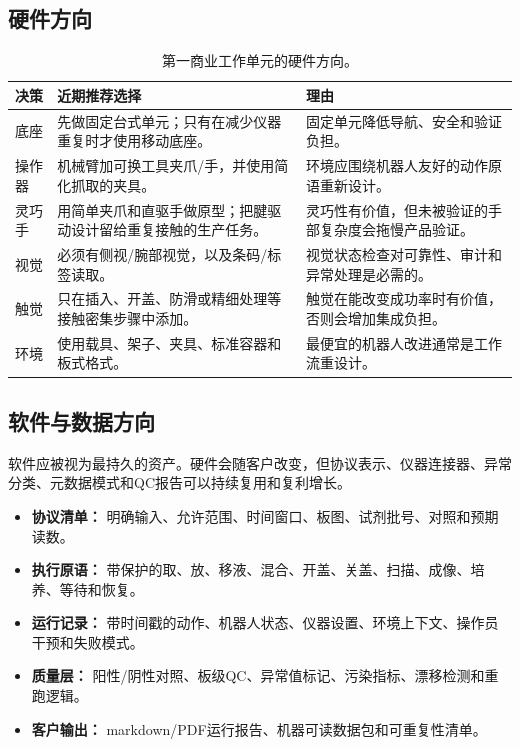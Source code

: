 \documentclass[11pt,fontset=none]{ctexart}
\begin{document}
\subsection{硬件方向}

\begin{table}[htbp]
\centering
\small
\begin{tabularx}{\linewidth}{@{}L{3.0cm}YY@{}}
\toprule
\textbf{决策} & \textbf{近期推荐选择} & \textbf{理由} \\
\midrule
底座 & 先做固定台式单元；只有在减少仪器重复时才使用移动底座。 & 固定单元降低导航、安全和验证负担。 \\
操作器 & 机械臂加可换工具夹爪/手，并使用简化抓取的夹具。 & 环境应围绕机器人友好的动作原语重新设计。 \\
灵巧手 & 用简单夹爪和直驱手做原型；把腱驱动设计留给重复接触的生产任务。 & 灵巧性有价值，但未被验证的手部复杂度会拖慢产品验证。 \\
视觉 & 必须有侧视/腕部视觉，以及条码/标签读取。 & 视觉状态检查对可靠性、审计和异常处理是必需的。 \\
触觉 & 只在插入、开盖、防滑或精细处理等接触密集步骤中添加。 & 触觉在能改变成功率时有价值，否则会增加集成负担。 \\
环境 & 使用载具、架子、夹具、标准容器和板式格式。 & 最便宜的机器人改进通常是工作流重设计。 \\
\bottomrule
\end{tabularx}
\caption{第一商业工作单元的硬件方向。}
\label{tab:hardware-cn}
\end{table}

\subsection{软件与数据方向}

软件应被视为最持久的资产。硬件会随客户改变，但协议表示、仪器连接器、异常分类、元数据模式和QC报告可以持续复用和复利增长。

\begin{itemize}
  \item \textbf{协议清单：} 明确输入、允许范围、时间窗口、板图、试剂批号、对照和预期读数。
  \item \textbf{执行原语：} 带保护的取、放、移液、混合、开盖、关盖、扫描、成像、培养、等待和恢复。
  \item \textbf{运行记录：} 带时间戳的动作、机器人状态、仪器设置、环境上下文、操作员干预和失败模式。
  \item \textbf{质量层：} 阳性/阴性对照、板级QC、异常值标记、污染指标、漂移检测和重跑逻辑。
  \item \textbf{客户输出：} markdown/PDF运行报告、机器可读数据包和可重复性清单。
\end{itemize}
\end{document}
